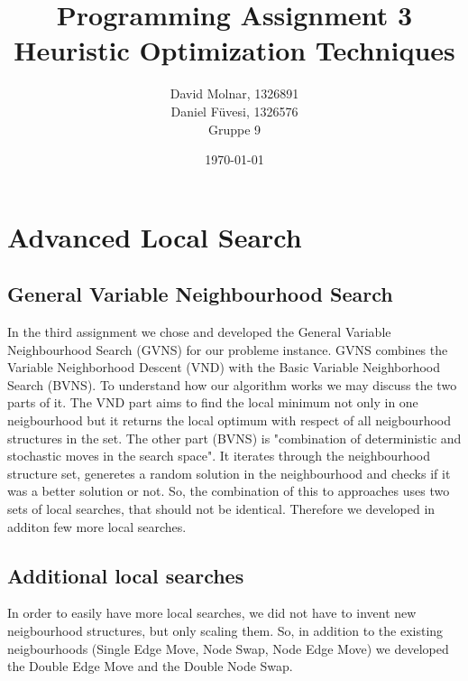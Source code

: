 \documentclass[11pt]{article}
\title{Programming Assignment 3\\ \vspace{10px} \large Heuristic Optimization Techniques}
\author{David Molnar, 1326891\\ Daniel Füvesi, 1326576\\Gruppe 9}
\date{\today}
\begin{document}
\lstset{language=Java}
\maketitle
 
\section{Advanced Local Search}
\subsection{General Variable Neighbourhood Search}
\hspace{0.5cm} In the third assignment we chose and developed the General Variable Neighbourhood Search (GVNS) for our probleme instance. GVNS combines the Variable Neighborhood Descent (VND) with the Basic Variable Neighborhood Search (BVNS). To understand how our algorithm works we may discuss the two parts of it. The VND part aims to find the local minimum not only in one neigbourhood but it returns the local optimum with respect of all neigbourhood structures in the set. The other part (BVNS) is "combination of deterministic and stochastic moves in the search
space". It iterates through the neighbourhood structure set, generetes a random solution in the neighbourhood and checks if it was a better solution or not. So, the combination of this to approaches uses two sets of local searches, that should not be identical. Therefore we developed in additon few more local searches. \\

\subsection{Additional local searches}
\hspace{0.5cm} In order to easily have more local searches, we did not have to invent new neigbourhood structures, but only scaling them. So, in addition to the existing neigbourhoods (Single Edge Move, Node Swap, Node Edge Move) we developed the Double Edge Move and the Double Node Swap.\\
\end{document}
